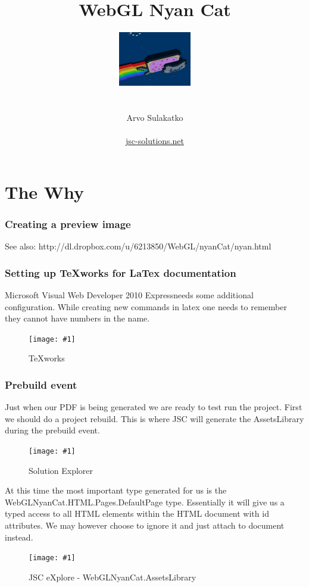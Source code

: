 \documentclass[12pt,leqno]{book}
\title{WebGL Nyan Cat}
\author{\includegraphics{../Design/Preview.png} \\ \\ \\ Arvo Sulakatko \\ \\ \href{http://www.jsc-solutions.net}{jsc-solutions.net} }
\newcommand{\webdev}{Microsoft Visual Web Developer 2010 Express}
\newcommand{\png}[1]{\texttt{[image: \#1]}}
\newcommand{\figpng}[2]{\begin{figure}[htb]\centering\png{#1}\caption{#2}\end{figure}}
\begin{document}
\maketitle



\tableofcontents
\listoffigures


\chapter{The Why}



\subsection{Creating a preview image}

See also: http://dl.dropbox.com/u/6213850/WebGL/nyanCat/nyan.html





\subsection{Setting up TeXworks for LaTex documentation}

\webdev needs some additional configuration. While creating new commands in latex one needs to remember they cannot have numbers in the name.

\figpng{Images/jsc-webgl-nyan-cat.pdf_-_TeXworks-2012-03-31_12.31.15}
{TeXworks}



\subsection{Prebuild event}
Just when our PDF is being generated we are ready to test run the project.
First we should do a project rebuild. This is where JSC will generate the AssetsLibrary during the prebuild event.

\figpng{Images/WebGLNyanCat_-_Microsoft_Visual_Web_Developer_2010_Express-2012-03-31_12.37.24}
{Solution Explorer}

At this time the most important type generated for us is the WebGLNyanCat.HTML.Pages.DefaultPage type. Essentially it will give us a typed access to all HTML elements within the HTML document with id attributes. We may however choose to ignore it and just attach to document instead.

\figpng{Images/eXplore-2012-03-31_12.41.39}
{JSC eXplore - WebGLNyanCat.AssetsLibrary}
\end{document}

